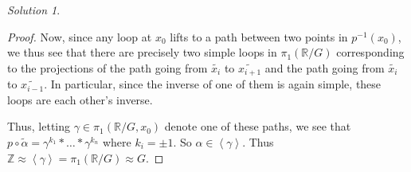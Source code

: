 \documentclass[reqno]{amsart}
\theoremstyle{definition}
\theoremstyle{remark}
\newtheorem*{solution}{Solution}
\begin{document}
\begin{solution}
\begin{proof}
            Now, since any loop at $x_0$ lifts
            to a path between two points in
            $p^{-1}(x_0)$, we thus see that
            there are precisely two simple loops
            in $\pi_1 \left( \mathbb{R} /G \right) $ corresponding
            to the projections of the path going from
            $\tilde{x_i}$ to $\tilde{x_{i+1}}$ and
            the path going from $\tilde{x_{i}}$ to 
            $\tilde{x_{i-1}}$. In particular, since
            the inverse of one of them is again simple, these
            loops are each other's inverse. 


            Thus, letting $\gamma \in 
            \pi_1 \left( \mathbb{R} /G, x_0 \right) $ denote
            one of these paths, we see that
            $p \circ \tilde{\alpha}
            = \gamma^{k_1} * \ldots * \gamma^{k_n}$ where
            $k_i = \pm 1 $. So
            $\alpha \in  \left<\gamma  \right>$.
            Thus
            $\mathbb{Z} \approx \left<\gamma \right> =
            \pi_1 \left( \mathbb{R} / G \right) \approx
            G$.


        \end{proof}
        







    \end{solution}









\end{document}
